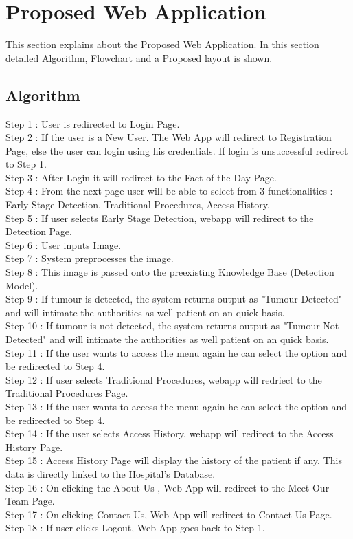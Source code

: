 
\section{Proposed Web Application}
This section explains about the Proposed Web Application. In this section detailed Algorithm, Flowchart and a Proposed layout is shown.
\subsection{Algorithm}
Step 1 : User is redirected to Login Page.\\
Step 2 : If the user is a New User. The Web App will redirect to Registration Page, else the user can login using his credentials. If login is unsuccessful redirect to Step 1.\\
Step 3 : After Login it will redirect to the Fact of the Day Page.\\
Step 4 : From the next page user will be able to select from 3 functionalities : Early Stage Detection, Traditional Procedures, Access History.\\
Step 5 : If user selects Early Stage Detection, webapp will redirect to the Detection Page. \\
Step 6 : User inputs Image.\\
Step 7 : System preprocesses the image.\\
Step 8 : This image is passed onto the preexisting Knowledge Base (Detection Model).\\
Step 9 : If tumour is detected, the system returns output as "Tumour Detected" and will intimate the authorities as well patient on an quick basis.\\
Step 10 : If tumour is not detected, the system returns output as "Tumour Not Detected" and will intimate the authorities as well patient on an quick basis.\\
Step 11 : If the user wants to access the menu again he can select the option and be redirected to Step 4.\\
Step 12 : If user selects Traditional Procedures, webapp will redriect to the Traditional Procedures Page.\\ 
Step 13 : If the user wants to access the menu again he can select the option and be redirected to Step 4.\\
Step 14 : If the user selects Access History, webapp will redirect to the Access History Page. \\
Step 15 : Access History Page will display the history of the patient if any. This data is directly linked to the Hospital's Database.\\
Step 16 : On clicking the About Us , Web App will redirect to the Meet Our Team Page.\\ 
Step 17 : On clicking Contact Us, Web App will redirect to Contact Us Page.\\ 
Step 18 : If user clicks Logout, Web App goes back to Step 1.\\

